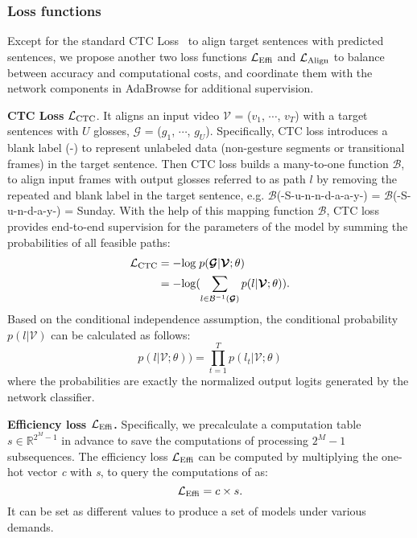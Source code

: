 \documentclass[sigconf]{acmart}
\begin{document}
\subsubsection{Loss functions}
Except for the standard CTC Loss~\cite{graves2006connectionist} to align target sentences with predicted sentences, we propose another two loss functions $\mathcal{L}_{{\rm Effi}}$ and $\mathcal{L}_{{\rm Align}}$ to balance between accuracy and computational costs, and coordinate them with the network components in AdaBrowse for additional supervision.

\textbf{CTC Loss} $\mathcal{L}_{{\rm CTC}}$. It aligns an input video $\mathcal{V}$ = ($v_1$, $\cdots$, $v_T$) with a target sentences with $U$ glosses, $\mathcal{G}$ = ($g_1$, $\cdots$, $g_U$). Specifically, CTC loss introduces a blank label (-) to represent unlabeled data (non-gesture segments or transitional frames) in the target sentence. Then CTC loss builds a many-to-one function $\mathcal{B}$, to align input frames with output glosses referred to as path $l$ by removing the repeated and blank label in the target sentence, e.g. $\mathcal{B}$(-S-u-n-n-d-a-a-y-) = $\mathcal{B}$(-S-u-n-d-a-y-) = Sunday. With the help of this mapping function $\mathcal{B}$, CTC loss provides end-to-end supervision for the parameters of the model by summing the probabilities of all feasible paths:
\begin{equation}
  \label{e8}
  \begin{aligned}
    \mathcal{L}_{{\rm CTC}} &= -{\rm log}\; p(\bm{\mathcal{G}}|\bm{\mathcal{V}};\theta) \\ &= -{\rm log}(\sum_{l\in \mathcal{B}^{-1}(\bm{\mathcal{G}})} p(l|\bm{\mathcal{V}};\theta) ).
  \end{aligned}
\end{equation}
Based on the conditional independence assumption, the conditional probability $p(l|\bm{\mathcal{V}})$ can be calculated as follows: 
\begin{equation}
  \label{e9}
  p(l|\bm{\mathcal{V}};\theta) ) = \prod_{t=1}^{T}{p(l_t|\mathcal{V};\theta)}
\end{equation}
where the probabilities are exactly the normalized output logits generated by the network classifier.

\textbf{Efficiency loss $\mathcal{L}_{{\rm Effi}}$.} Specifically, we precalculate a computation table $s\in \mathbb{R}^{2^M-1}$ in advance to save the computations of processing $2^M-1$ subsequences. The efficiency loss $\mathcal{L}_{{\rm Effi}}$ can be computed by multiplying the one-hot vector \textit{c} with \textit{s}, to query the computations of as:
  \begin{equation}
  \label{e10}
  \mathcal{L}_{{\rm Effi}} =  c \times s.
  \end{equation}
It can be set as different values to produce a set of models under various demands.
  
\end{document}
